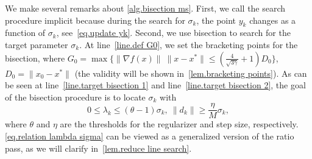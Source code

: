 \documentclass{article}
\begin{document}
\begin{algorithm}[!ht]
    \caption{Bisection for AT\_RMS}\label{alg.bisection ms}
    \begin{algorithmic}[1]
        \label{line.early termination ms}
        \ELSE
        \label{line.target bisection 1}
        \STATE{$\sigma_+=\sigma$}
        \label{line.target bisection 2}
        \STATE{$\sigma_- = \sigma$}
        \ELSE
        \ENDIF
        \ENDWHILE
        \ENDIF
    \end{algorithmic}
\end{algorithm}

We make several remarks about \autoref{alg.bisection ms}. First, we call the search procedure implicit because during the search for $\sigma_k$, the point $y_k$ changes as a function of $\sigma_k$, see~\eqref{eq.update yk}. Second, we use bisection to search for the target parameter $\sigma_k$. At line~\ref{line.def G0}, we set the bracketing points for the bisection, where
$G_0 = \max\{\|\nabla f(x)\| \ \|x-x^*\|\leq \left(\frac{4}{\sqrt{3\gamma}}+1\right)D_0\}$, $D_0 = \|x_0-x^*\|$ (the validity will be shown in~\autoref{lem.bracketing points}). As can be seen at line~\ref{line.target bisection 1} and line~\ref{line.target bisection 2}, the goal of the bisection procedure is to locate $\sigma_k$ with
\begin{equation}
    \label{eq.relation lambda sigma}
        0\leq \lambda_k\leq (\theta-1)\sigma_k, \ \|d_k\| \geq \frac{\eta}{M}\sigma_k,
\end{equation}
where $\theta$ and $\eta$ are the thresholds for the regularizer and step size, respectively. \eqref{eq.relation lambda sigma} can be viewed as a generalized version of the ratio pass, as we will clarify in~\autoref{lem.reduce line search}. 
\end{document}
